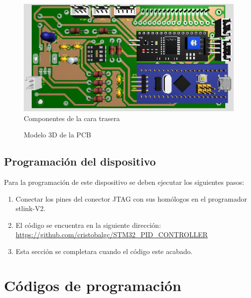 \documentclass[10pt,a4paper,oneside]{article}
\begin{document}
\begin{figure}[H]
\centering
\includegraphics[scale=0.6]{Imagenes/PCB_COMPONENTES_CARA_TRASERA.jpg}
\caption[Vista de los componentes de la cara trasera de la PCB]{Componentes de la cara trasera}
\label{fig:005}
\end{figure}

\begin{figure}[h]
\centering
{}
 \caption[Vista 3D del modelo de la PCB]{Modelo 3D de la PCB}
\label{fig:PCB_3D_MODEL}
\end{figure}

\subsection{Programación del dispositivo}%

Para la programación de este dispositivo se deben ejecutar los siguientes pasos:

\begin{enumerate}
	\item Conectar los pines del conector JTAG con sus homólogos en el programador stlink-V2.
	\item El código se encuentra en la siguiente dirección: \url{https://github.com/cristobalgc/STM32_PID_CONTROLLER}
	\item Esta sección se completara cuando el código este acabado.
\end{enumerate}

\section{Códigos de programación}%
\end{document}
